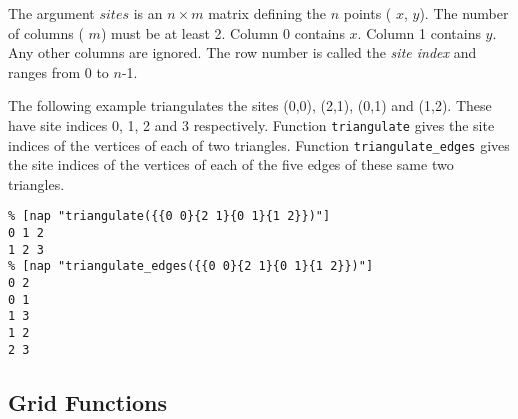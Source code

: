   \par The argument 
  $sites$ is an 
  $n\times m$ matrix defining the 
  $n$ points ( 
  $x$, 
  $y$). The number of columns ( 
  $m$) must be at least 2. Column 0 contains 
  $x$. Column 1 contains 
  $y$. Any other columns are ignored. The row number is called
  the 
  \textit{site index} and ranges from 0 to 
  $n$-1.
  \par The following example triangulates the sites (0,0), (2,1), (0,1)
  and (1,2). These have site indices 0, 1, 2 and 3 respectively.
  Function 
  \texttt{triangulate} gives the site indices of the vertices of
  each of two triangles. Function 
  \texttt{triangulate\_edges} gives the site indices of the vertices
  of each of the five edges of these same two triangles.
  \begin{verbatim}
% [nap "triangulate({{0 0}{2 1}{0 1}{1 2}})"]
0 1 2
1 2 3
% [nap "triangulate_edges({{0 0}{2 1}{0 1}{1 2}})"]
0 2
0 1
1 3
1 2
2 3
\end{verbatim}

  \subsection{
    \label{function:Grid}Grid Functions
  }

